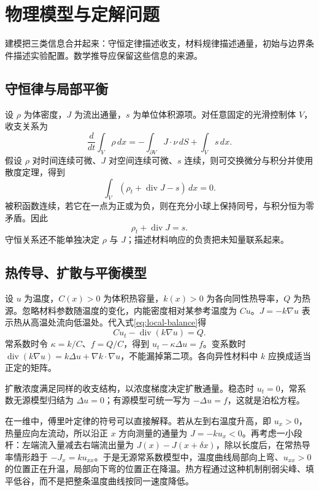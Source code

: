 \documentclass[UTF8,12pt,a4paper,fontset=fandol]{ctexbook}
\begin{document}
\chapter{物理模型与定解问题}
\label{chap:modeling}

建模把三类信息合并起来：守恒定律描述收支，材料规律描述通量，初始与边界条件描述实验配置。数学推导应保留这些信息的来源。

\section{守恒律与局部平衡}
设 $\rho$ 为体密度，$J$ 为流出通量，$s$ 为单位体积源项。对任意固定的光滑控制体 $V$，收支关系为
\begin{equation}
 \frac{d}{dt}\int_V\rho\,dx
 =-\int_{\partial V}J\cdot\nu\,dS+\int_Vs\,dx.
 \label{eq:balance-integral}
\end{equation}
假设 $\rho$ 对时间连续可微、$J$ 对空间连续可微、$s$ 连续，则可交换微分与积分并使用散度定理，得到
\[
 \int_V(\rho_t+\operatorname{div}J-s)\,dx=0.
\]
被积函数连续，若它在一点为正或为负，则在充分小球上保持同号，与积分恒为零矛盾。因此
\begin{equation}
 \rho_t+\operatorname{div}J=s.
 \label{eq:local-balance}
\end{equation}
守恒关系还不能单独决定 $\rho$ 与 $J$；描述材料响应的负责把未知量联系起来。

\section{热传导、扩散与平衡模型}
设 $u$ 为温度，$C(x)>0$ 为体积热容量，$k(x)>0$ 为各向同性热导率，$Q$ 为热源。忽略材料参数随温度的变化，内能密度相对某参考温度为 $Cu$。$J=-k\nabla u$ 表示热从高温处流向低温处。代入式\eqref{eq:local-balance}得
\begin{equation}
 C u_t-\operatorname{div}(k\nabla u)=Q.
 \label{eq:heat-model}
\end{equation}
常系数时令 $\kappa=k/C$、$f=Q/C$，得到 $u_t-\kappa\Delta u=f$。变系数时 $\operatorname{div}(k\nabla u)=k\Delta u+\nabla k\cdot\nabla u$，不能漏掉第二项。各向异性材料中 $k$ 应换成适当正定的矩阵。

扩散浓度满足同样的收支结构，以浓度梯度决定扩散通量。稳态时 $u_t=0$，常系数无源模型归结为 $\Delta u=0$；有源模型可统一写为 $-\Delta u=f$，这就是泊松方程。

在一维中，傅里叶定律的符号可以直接解释。若从左到右温度升高，即 $u_x>0$，热量应向左流动，所以沿正 $x$ 方向测量的通量为 $J=-ku_x<0$。再考虑一小段杆：左端流入量减去右端流出量为 $J(x)-J(x+\delta x)$，除以长度后，在常热导率情形趋于 $-J_x=ku_{xx}$。于是无源常系数模型中，温度曲线局部向上弯、$u_{xx}>0$ 的位置正在升温，局部向下弯的位置正在降温。热方程通过这种机制削弱尖峰、填平低谷，而不是把整条温度曲线按同一速度降低。
\end{document}
